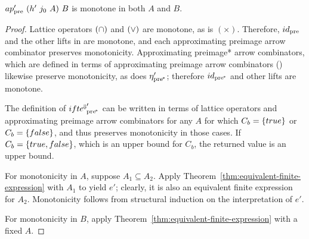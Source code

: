 \begin{theorem}[monotone]
\label{thm:monotonicity}
$ap_\mathrm{pre}'~(h'~j_0~A)~B$ is monotone in both $A$ and $B$.%
\end{theorem}
\begin{proof}
Lattice operators $(\cap)$ and $(\vee)$ are monotone, as is $(\times)$.
Therefore, $id_\mathrm{pre}$ and the other lifts in  are monotone, and each approximating preimage arrow combinator preserves monotonicity.
Approximating preimage* arrow combinators, which are defined in terms of approximating preimage arrow combinators () likewise preserve monotonicity, as does $\eta_\mathrm{pre^{\mspace{-2mu}*}}'$; therefore $id_\mathrm{pre^{\mspace{-2mu}*}}$ and other lifts are monotone.

The definition of ${ifte^{\mspace{-2mu}\Downarrow\mspace{-2mu}}}_\mathrm{pre^{\mspace{-2mu}*}}'$ can be written in terms of lattice operators and approximating preimage arrow combinators for any $A$ for which $C_b = \{{true}\}$ or $C_b = \{{false}\}$, and thus preserves monotonicity in those cases.
If $C_b = \{{true,false}\}$, which is an upper bound for $C_b$, the returned value is an upper bound.

For monotonicity in $A$, suppose $A_1 \subseteq A_2$.
Apply Theorem~\ref{thm:equivalent-finite-expression} with $A_1$ to yield $\mathit{e'}$; clearly, it is also an equivalent finite expression for $A_2$.
Monotonicity follows from structural induction on the interpretation of $\mathit{e'}$.

For monotonicity in $B$, apply Theorem~\ref{thm:equivalent-finite-expression} with a fixed $A$.
\end{proof}

